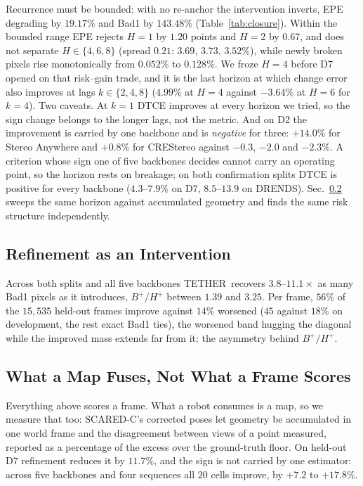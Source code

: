 \documentclass[letterpaper,10pt,conference]{ieeeconf}
\newcommand{\steer}{TETHER}
\begin{document}
Recurrence must be bounded: with no re-anchor the intervention inverts, EPE
degrading by $19.17\%$ and Bad1 by $143.48\%$ (Table~\ref{tab:closure}).
Within the bounded range EPE rejects $H{=}1$ by $1.20$ points and $H{=}2$ by
$0.67$, and does not separate $H\in\{4,6,8\}$ (spread $0.21$: $3.69$,
$3.73$, $3.52\%$),
while newly broken pixels rise monotonically from $0.052\%$ to $0.128\%$. We
froze $H{=}4$ before D7 opened on that risk--gain trade, and it is the last
horizon at which change error also improves at lags $k\in\{2,4,8\}$ ($4.99\%$
at $H{=}4$ against $-3.64\%$ at $H{=}6$ for $k{=}4$). Two caveats. At $k{=}1$
DTCE improves at every horizon we tried, so the sign change belongs to the
longer lags, not the metric. And on D2 the improvement is carried by one
backbone and is \emph{negative} for three: $+14.0\%$ for Stereo Anywhere and
$+0.8\%$ for CREStereo against $-0.3$, $-2.0$ and $-2.3\%$. A criterion whose
sign one of five backbones decides cannot carry an operating point, so the
horizon rests on breakage; on both confirmation splits DTCE is positive for
every backbone ($4.3$--$7.9\%$ on D7, $8.5$--$13.9$ on DRENDS).
Sec.~\ref{sec:mapping} sweeps the same horizon against accumulated geometry
and finds the same risk structure independently.

\subsection{Refinement as an Intervention}

Across both splits and all five backbones \steer\ recovers $3.8$--$11.1\times$
as many Bad1 pixels as it introduces, $B^+/H^+$ between $1.39$ and $3.25$.
Per frame, $56\%$ of the $15{,}535$ held-out frames improve against $14\%$
worsened ($45$ against $18\%$ on development, the rest exact Bad1 ties), the
worsened band hugging the diagonal while the improved mass extends far from
it: the asymmetry behind $B^+/H^+$.


\subsection{What a Map Fuses, Not What a Frame Scores}
\label{sec:mapping}

Everything above scores a frame. What a robot consumes is a map, so we measure
that too: SCARED-C's corrected poses let geometry be accumulated in one world
frame and the disagreement between views of a point measured, reported as a
percentage of the excess over the ground-truth floor. On held-out D7
refinement reduces it by $11.7\%$, and the sign is not carried by one
estimator: across five backbones and four sequences all $20$ cells improve, by
$+7.2$ to $+17.8\%$.
\end{document}
